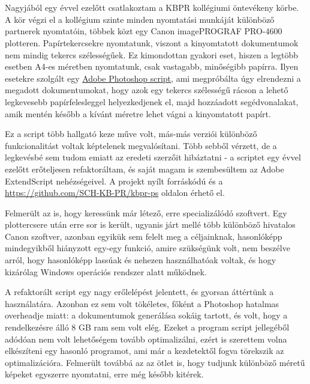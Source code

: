 \chapter{\bevezetes}

Nagyjából egy évvel ezelőtt csatlakoztam a KBPR kollégiumi öntevékeny körbe. A kör végzi el a kollégium szinte minden nyomtatási munkáját különböző partnerek nyomtatóin, többek közt egy Canon imagePROGRAF PRO-4600 plotteren. Papírtekercsekre nyomtatunk, viszont a kinyomtatott dokumentumok nem mindig tekercs szélességűek. Ez kimondottan gyakori eset, hiszen a legtöbb esetben A4-es méretben nyomtatunk, csak vastagabb, minőségibb papírra. Ilyen esetekre szolgált egy \href{fig:old_ui}{Adobe Photoshop script}, ami megpróbálta úgy elrendezni a megadott dokumentumokat, hogy azok egy tekercs szélességű rácson a lehető legkevesebb papírfelesleggel helyezkedjenek el, majd hozzáadott segédvonalakat, amik mentén később a kívánt méretre lehet vágni a kinyomtatott papírt.

Ez a script több hallgató keze műve volt, más-más verziói különböző funkcionalitást voltak képtelenek megvalósítani. Több sebből vérzett, de a legkevésbé sem tudom emiatt az eredeti szerzőit hibáztatni - a scriptet egy évvel ezelőtt erőteljesen refaktoráltam, és saját magam is szembesültem az Adobe ExtendScript nehézségeivel. A projekt nyílt forráskódú és a \href{https://github.com/SCH-KB-PR/kbpr-ps}{https://github.com/SCH-KB-PR/kbpr-ps} oldalon érhető el.

Felmerült az is, hogy keressünk már létező, erre specializálódó szoftvert. Egy plottercsere után erre sor is került, ugyanis járt mellé több különböző hivatalos Canon szoftver, azonban egyikük sem felelt meg a céljainknak, hasonlóképp mindegyikből hiányzott egy-egy funkció, amire szükségünk volt, nem beszélve arról, hogy hasonlóképp lassúak és nehezen használhatóak voltak, és hogy kizárólag Windows operációs rendszer alatt működnek.

A refaktorált script egy nagy erőlelépést jelentett, és gyorsan áttértünk a használatára. Azonban ez sem volt tökéletes, főként a Photoshop hatalmas overheadje miatt: a dokumentumok generálása sokáig tartott, és volt, hogy a rendelkezésre álló 8 GB ram sem volt elég. Ezeket a program script jellegéből adódóan nem volt lehetőségem tovább optimalizálni, ezért is szerettem volna elkészíteni egy hasonló programot, ami már a kezdetektől fogva törekszik az optimalizációra. Felmerült továbbá az az ötlet is, hogy tudjunk különböző méretű képeket egyszerre nyomtatni, erre még később kitérek.

